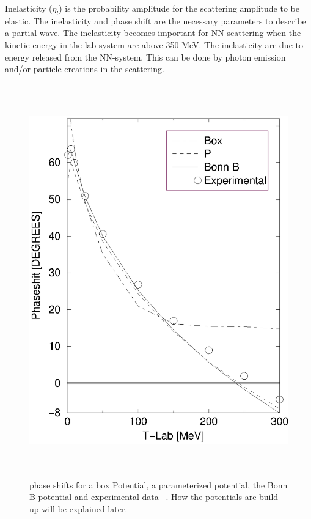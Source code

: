 Inelasticity ($\eta_l$) is the probability amplitude for the scattering amplitude to be elastic. 
The inelasticity and phase shift are the necessary parameters to describe a partial wave. The inelasticity
becomes important for NN-scattering when the kinetic energy in the lab-system are above 350 MeV.
The inelasticity are due to energy released from the NN-system. This can be done by photon emission and/or particle
creations in the scattering.

  



\begin{flushleft} 

\begin{figure}\label{fig:manypotS}
\centering
\includegraphics[height=17cm]{manypotS.eps} 
\caption{ phase shifts for a box Potential, a parameterized potential, the Bonn B potential and
experimental data ~\cite{PRC48faseskift350MeV}. How the potentials are build up will be explained later.}
\end{figure}


\end{flushleft}


